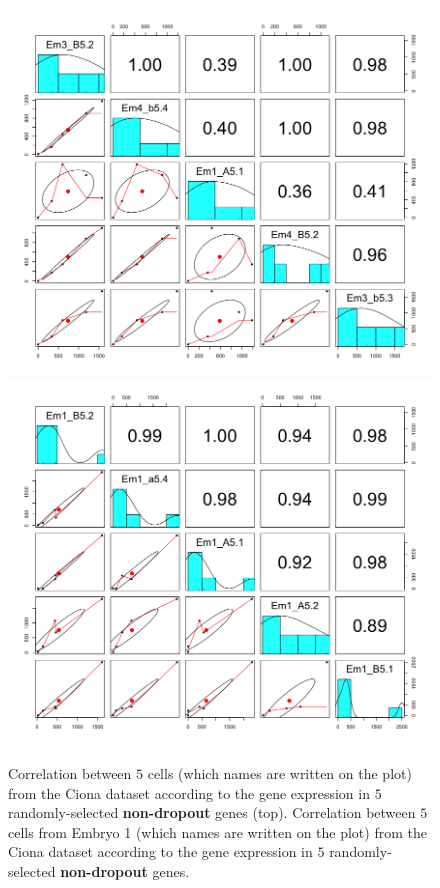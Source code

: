 \documentclass{report}
\begin{document}
{\begin{figure}[H]
\centering
\subfigure\includegraphics[scale=0.35]{plotsCopula/ciona/depCellnGene_nodropout_ciona.png}
\subfigure\includegraphics[scale=0.35]{plotsCopula/ciona/depCellnGene_nodropout_em1_ciona.png}
\caption{Correlation between $5$ cells (which names are written on the plot) from the Ciona dataset according to the gene expression in $5$ randomly-selected \textbf{non-dropout} genes (top). Correlation between $5$ cells from Embryo 1 (which names are written on the plot) from the Ciona dataset according to the gene expression in $5$ randomly-selected \textbf{non-dropout} genes.}
\label{cellcorrelationnodropout2}
\end{figure}

}
\end{document}
